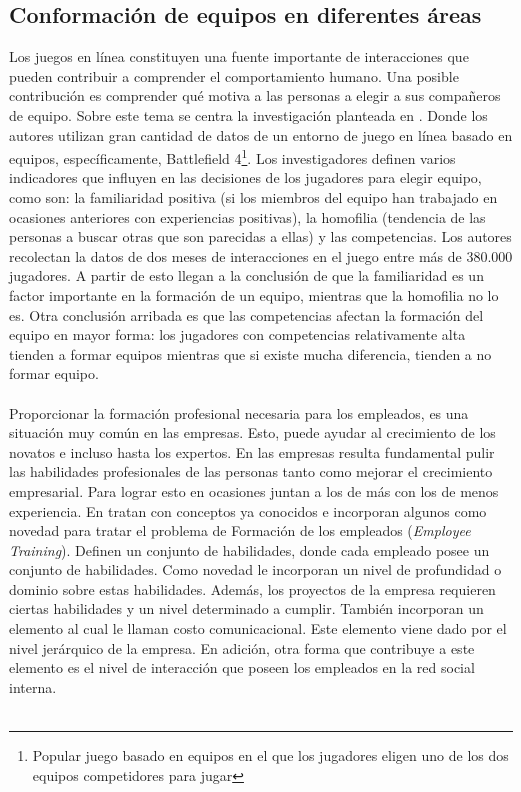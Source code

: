 \subsection{Conformación de equipos en diferentes áreas}
Los juegos en línea constituyen una fuente importante de interacciones que pueden contribuir a comprender el comportamiento humano. Una posible contribución es comprender qué motiva a las personas a elegir a sus compañeros de equipo. Sobre este tema se centra la investigación planteada en \cite{Alhazmi2017}. Donde los autores utilizan gran cantidad de datos de un entorno de juego en línea basado en equipos, específicamente, Battlefield 4\footnote{Popular juego basado en equipos en el que los jugadores eligen uno de los dos equipos competidores para jugar}. Los investigadores definen varios indicadores que influyen en las decisiones de los jugadores para elegir equipo, como son: la familiaridad positiva (si los miembros del equipo han trabajado en ocasiones anteriores con experiencias positivas), la homofilia (tendencia de las personas a buscar otras que son parecidas a ellas) y las competencias. Los autores recolectan la datos de dos meses de interacciones en el juego entre más de 380.000 jugadores. A partir de esto llegan a la conclusión de que la familiaridad es un factor importante en la formación de un equipo, mientras que la homofilia no lo es. Otra conclusión arribada es que las competencias afectan la formación del equipo en mayor forma: los jugadores con competencias relativamente alta tienden a formar equipos mientras que si existe mucha diferencia, tienden a no formar equipo.\\\\

Proporcionar la formación profesional necesaria para los empleados, es una situación muy común en las empresas. Esto, puede ayudar al crecimiento de los novatos e incluso hasta los expertos. En las empresas resulta fundamental pulir las habilidades profesionales de las personas tanto como mejorar el crecimiento empresarial. Para lograr esto en ocasiones juntan a los de más con los de menos experiencia. En \cite{Zhang2017} tratan con conceptos ya conocidos e incorporan algunos como novedad para tratar el problema de Formación de los empleados (\textit{Employee Training}). Definen un conjunto de habilidades, donde cada empleado posee un conjunto de habilidades. Como novedad le incorporan un nivel de profundidad o dominio sobre estas habilidades. Además, los proyectos de la empresa requieren ciertas habilidades y un nivel determinado a cumplir. También incorporan un elemento al cual le llaman costo comunicacional. Este elemento viene dado por el nivel jerárquico de la empresa. En adición, otra forma que contribuye a este elemento es el nivel de interacción que poseen los empleados en la red social interna.\\\\


